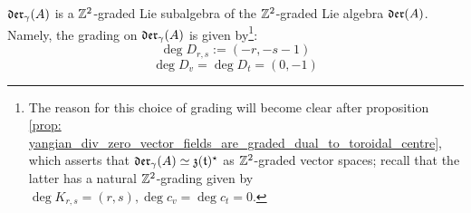         \begin{corollary} \label{coro: yangian_div_zero_vector_fields_are_graded}
            $\mathfrak{der}_{\gamma}(A)$ is a $\mathbb{Z}^2$-graded Lie subalgebra of the $\mathbb{Z}^2$-graded Lie algebra $\mathfrak{der}(A)$. Namely, the grading on $\mathfrak{der}_{\gamma}(A)$ is given by\footnote{The reason for this choice of grading will become clear after proposition \ref{prop: yangian_div_zero_vector_fields_are_graded_dual_to_toroidal_centre}, which asserts that $\mathfrak{der}_{\gamma}(A) \simeq \mathfrak{z}(\mathfrak{t})^{\star}$ as $\mathbb{Z}^2$-graded vector spaces; recall that the latter has a natural $\mathbb{Z}^2$-grading given by $\deg K_{r, s} = (r, s), \deg c_v = \deg c_t = 0$.}:
                $$\deg D_{r, s} := (-r, -s - 1)$$
                $$\deg D_v = \deg D_t = (0, -1)$$
        \end{corollary}

